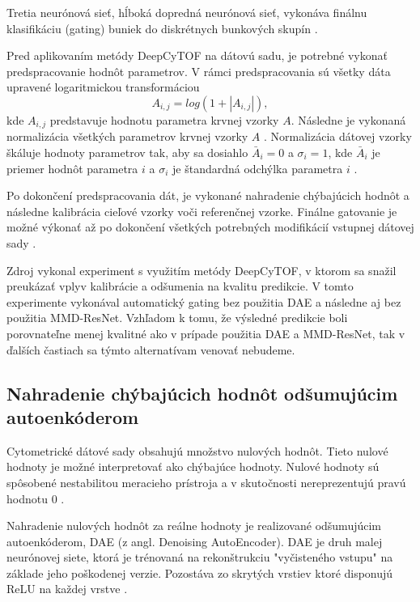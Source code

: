 Tretia neurónová sieť, hĺboká dopredná neurónová sieť, vykonáva finálnu klasifikáciu (gating) buniek do diskrétnych bunkových skupín \cite{Li2017}.

Pred aplikovaním metódy DeepCyTOF na dátovú sadu, je potrebné vykonať predspracovanie hodnôt parametrov. V rámci predspracovania sú všetky dáta upravené logaritmickou transformáciou
\begin{equation}
    A_{i,j} = log(1+|A_{i,j}|),
\end{equation}
kde $A_{i,j}$ predstavuje hodnotu parametra krvnej vzorky $A$. Následne je vykonaná normalizácia všetkých parametrov krvnej vzorky $A$ \cite{Li2016, Li2017}. Normalizácia dátovej vzorky škáluje hodnoty parametrov tak, aby sa dosiahlo $\bar{A}_i=0$ a $\sigma_i=1$, kde $\bar{A}_i$ je priemer hodnôt parametra $i$ a $\sigma_i$ je štandardná odchýlka parametra $i$ \cite{Aksoy}.

Po dokončení predspracovania dát, je vykonané nahradenie chýbajúcich hodnôt a následne kalibrácia cieľové vzorky voči referenčnej vzorke. Finálne gatovanie je možné výkonať až po dokončení všetkých potrebných modifikácií vstupnej dátovej sady \cite{Li2017}. 

Zdroj \cite{Li2017} vykonal experiment s využitím metódy DeepCyTOF, v ktorom sa snažil preukázať vplyv kalibrácie a odšumenia na kvalitu predikcie. V tomto experimente vykonával automatický gating bez použitia DAE a následne aj bez použitia MMD-ResNet. Vzhľadom k tomu, že výsledné predikcie boli porovnateľne menej kvalitné ako v prípade použitia DAE a MMD-ResNet, tak v ďalších častiach sa týmto alternatívam venovať nebudeme.

\subsection{Nahradenie chýbajúcich hodnôt odšumujúcim autoenkóderom}

Cytometrické dátové sady obsahujú množstvo nulových hodnôt. Tieto nulové hodnoty je možné interpretovať ako chýbajúce hodnoty. Nulové hodnoty sú spôsobené nestabilitou meracieho prístroja a v skutočnosti nereprezentujú pravú hodnotu 0 \cite{Li2017}.

Nahradenie nulových hodnôt za reálne hodnoty je realizované odšumujúcim autoenkóderom, DAE (z angl. Denoising AutoEncoder). DAE je druh malej neurónovej siete, ktorá je trénovaná na rekonštrukciu "vyčisteného vstupu" na základe jeho poškodenej verzie. Pozostáva zo skrytých vrstiev ktoré disponujú ReLU na každej vrstve \cite{Li2017}.


